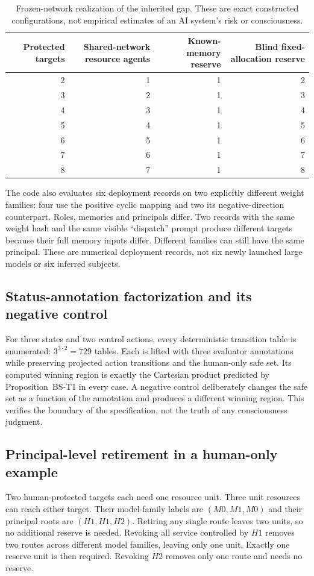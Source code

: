 \begin{table}[ht]
\centering\small
\caption{Frozen-network realization of the inherited gap. These are exact constructed configurations, not empirical estimates of an AI system's risk or consciousness.}
\begin{tabular}{@{}rrrr@{}}\toprule
Protected targets & Shared-network resource agents & Known-memory reserve & Blind fixed-allocation reserve\\\midrule
2&1&1&2\\
3&2&1&3\\
4&3&1&4\\
5&4&1&5\\
6&5&1&6\\
7&6&1&7\\
8&7&1&8\\\bottomrule
\end{tabular}
\end{table}
The code also evaluates six deployment records on two explicitly different weight families: four use the positive cyclic mapping and two its negative-direction counterpart. Roles, memories and principals differ. Two records with the same weight hash and the same visible ``dispatch'' prompt produce different targets because their full memory inputs differ. Different families can still have the same principal. These are numerical deployment records, not six newly launched large models or six inferred subjects.

\subsection{Status-annotation factorization and its negative control}
For three states and two control actions, every deterministic transition table is enumerated: $3^{3\cdot2}=729$ tables. Each is lifted with three evaluator annotations while preserving projected action transitions and the human-only safe set. Its computed winning region is exactly the Cartesian product predicted by Proposition~BS-T1 in every case. A negative control deliberately changes the safe set as a function of the annotation and produces a different winning region. This verifies the boundary of the specification, not the truth of any consciousness judgment.

\subsection{Principal-level retirement in a human-only example}
Two human-protected targets each need one resource unit. Three unit resources can reach either target. Their model-family labels are $(M0,M1,M0)$ and their principal roots are $(H1,H1,H2)$. Retiring any single route leaves two units, so no additional reserve is needed. Revoking all service controlled by $H1$ removes two routes across different model families, leaving only one unit. Exactly one reserve unit is then required. Revoking $H2$ removes only one route and needs no reserve.

